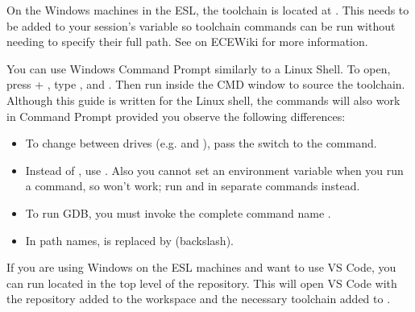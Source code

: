 On the Windows machines in the ESL, the toolchain is located at
. This needs to be added to your session's
 variable so toolchain commands can be run without needing to
specify their full path. See
 on ECEWiki for more
information.

You can use Windows Command Prompt similarly to a Linux Shell. To open, press
 + , type , and . Then run
 inside the CMD
window to source the toolchain. Although this guide is written for the Linux
shell, the commands will also work in Command Prompt provided you observe the
following differences:
\begin{itemize}
\item To change between drives (e.g.  and ), pass the
 switch to the  command.
\item Instead of , use .
Also you cannot set an environment variable when you run a command, so
 won't work; run  and  in
separate commands instead.
\item To run GDB, you must invoke the complete command name
.
\item In path names, \file{/} is replaced by \file{\textbackslash} (backslash).
\end{itemize}

If you are using Windows on the ESL machines and want to use VS Code, you can
run  located in the top level of the 
repository. This will open VS Code with the repository added to the workspace
and the necessary toolchain added to .
